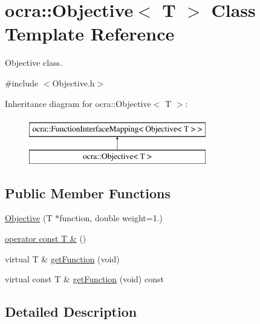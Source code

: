 \hypertarget{classocra_1_1Objective}{}\section{ocra\+:\+:Objective$<$ T $>$ Class Template Reference}
\label{classocra_1_1Objective}


Objective class.  




{\ttfamily \#include $<$Objective.\+h$>$}

Inheritance diagram for ocra\+:\+:Objective$<$ T $>$\+:\begin{figure}[H]
\begin{center}
\leavevmode
\includegraphics[height=2.000000cm]{df/d6c/classocra_1_1Objective}
\end{center}
\end{figure}
\subsection*{Public Member Functions}
\begin{DoxyCompactItemize}
\item 
\hyperlink{classocra_1_1Objective_a8ece61f7359bcc67cc5a10fde1ddd11d}{Objective} (T $\ast$function, double weight=1.)
\item 
\hyperlink{classocra_1_1Objective_adde3288cc5ad20394a3558c9b8092b71}{operator const T \&} ()
\end{DoxyCompactItemize}
{\bf }\par
\begin{DoxyCompactItemize}
\item 
virtual T \& \hyperlink{classocra_1_1Objective_acefbb478e0d9ae080ead812eea70e22e}{get\+Function} (void)
\item 
virtual const T \& \hyperlink{classocra_1_1Objective_a724137e4282c67586ce8b51a5b57845e}{get\+Function} (void) const
\end{DoxyCompactItemize}



\subsection{Detailed Description}
